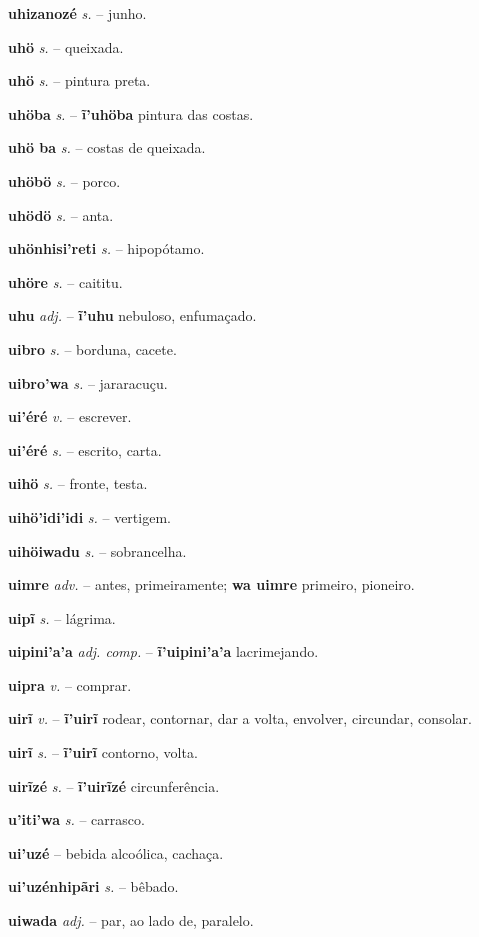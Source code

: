 \textbf{uhizanozé} \textit{s.} -- junho.

\textbf{uhö} \textit{s.} -- queixada.

\textbf{uhö} \textit{s.} -- pintura preta.

\textbf{uhöba} \textit{s.} -- \textbf{ĩ'uhöba} pintura das costas.

\textbf{uhö ba} \textit{s.} -- costas de queixada.

\textbf{uhöbö} \textit{s.} -- porco.

\textbf{uhödö} \textit{s.} -- anta.

\textbf{uhönhisi'reti} \textit{s.} -- hipopótamo.

\textbf{uhöre} \textit{s.} -- caititu.

\textbf{uhu} \textit{adj.} -- \textbf{ĩ'uhu} nebuloso, enfumaçado.

\textbf{uibro} \textit{s.} -- borduna, cacete.

\textbf{uibro'wa} \textit{s.} -- jararacuçu.

\textbf{ui'éré} \textit{v.} -- escrever.

\textbf{ui'éré} \textit{s.} -- escrito, carta.

\textbf{uihö} \textit{s.} -- fronte, testa.

\textbf{uihö'idi'idi} \textit{s.} -- vertigem.

\textbf{uihöiwadu} \textit{s.} -- sobrancelha.

\textbf{uimre} \textit{adv.} -- antes, primeiramente; 
\textbf{wa uimre} primeiro, pioneiro.

\textbf{uipĩ} \textit{s.} -- lágrima.

\textbf{uipini'a'a} \textit{adj. comp.} -- \textbf{ĩ'uipini'a'a} lacrimejando.

\textbf{uipra} \textit{v.} -- comprar.

\textbf{uirĩ} \textit{v.} -- \textbf{ĩ'uirĩ} rodear, contornar, dar a volta, envolver, circundar, consolar.

\textbf{uirĩ} \textit{s.} -- \textbf{ĩ'uirĩ} contorno, volta.

\textbf{uirĩzé} \textit{s.} -- \textbf{ĩ'uirĩzé} circunferência.

\textbf{u'iti'wa} \textit{s.} -- carrasco.

\textbf{ui'uzé} \textit{} -- bebida alcoólica, cachaça.

\textbf{ui'uzénhipãri} \textit{s.} -- bêbado.

\textbf{uiwada} \textit{adj.} -- par, ao lado de, paralelo.

